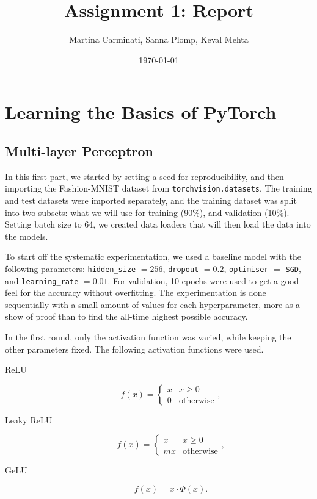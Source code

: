 \documentclass[a4paper]{article}
\title{Assignment 1: Report}
\author{Martina Carminati, Sanna Plomp, Keval Mehta}
\date{\today}
\begin{document}
\maketitle	

\section{Learning the Basics of PyTorch}\label{sec:basics}
\subsection{Multi-layer Perceptron}
In this first part, we started by setting a seed for reproducibility, and then importing the Fashion-MNIST dataset from \texttt{torchvision.datasets}. The training and test datasets were imported separately, and the training dataset was split into two subsets: what we will use for training (90\%), and validation (10\%). Setting batch size to 64, we created data loaders that will then load the data into the models.

To start off the systematic experimentation, we used a baseline model with the following parameters: \texttt{hidden\_size} \(= 256\), \texttt{dropout} \(= 0.2\), \texttt{optimiser} \(=\) \texttt{SGD}, and \texttt{learning\_rate} \(= 0.01\). For validation, 10 epochs were used to get a good feel for the accuracy without overfitting. The experimentation is done sequentially with a small amount of values for each hyperparameter, more as a show of proof than to find the all-time highest possible accuracy. 

In the first round, only the activation function was varied, while keeping the other parameters fixed. The following activation functions were used.
\begin{description}
	\item[ReLU]
		\[
		f(x) =
		\begin{cases}
			x & x \ge 0 \\
			0 & \text{otherwise}
		\end{cases}
		,\] 
	\item[Leaky ReLU]
		\[
		f(x) =
		\begin{cases}
			x & x \ge 0 \\
			mx & \text{otherwise}
		\end{cases}
		,\] 
	\item[GeLU]
		\[
		f(x) = x \cdot\Phi(x)
		.\] 
\end{description}
\end{document}
